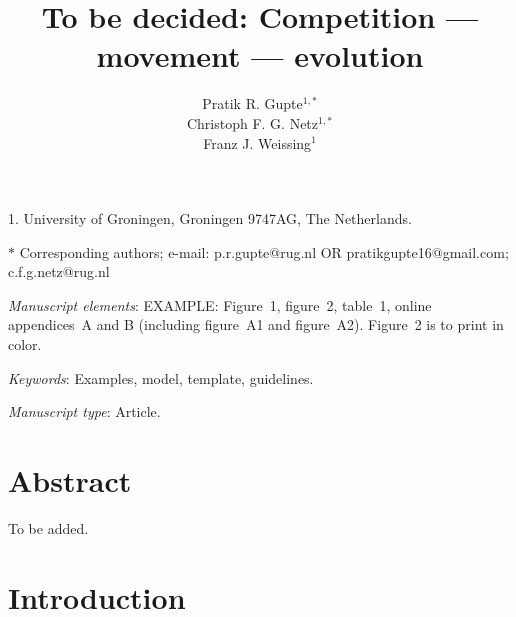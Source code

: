 \documentclass[11pt]{article}
\title{To be decided: Competition --- movement --- evolution}
\author{Pratik R. Gupte$^{1,\ast}$ \\ 
        Christoph F. G. Netz$^{1,\ast}$ \\ 
        Franz J. Weissing$^{1}$}
\date{}
\begin{document}
\maketitle

\noindent{} 1. University of Groningen, Groningen 9747AG, The Netherlands.

\noindent{} $\ast$ Corresponding authors; e-mail: p.r.gupte@rug.nl OR pratikgupte16@gmail.com; c.f.g.netz@rug.nl

\bigskip

\textit{Manuscript elements}: EXAMPLE: Figure~1, figure~2, table~1, online appendices~A and B (including figure~A1 and figure~A2). Figure~2 is to print in color.

\bigskip

\textit{Keywords}: Examples, model, template, guidelines.

\bigskip

\textit{Manuscript type}: Article. %

\bigskip


\linenumbers{}
\modulolinenumbers[1]

\newpage{}

\section{Abstract}

To be added.

\section{Introduction}
\end{document}
